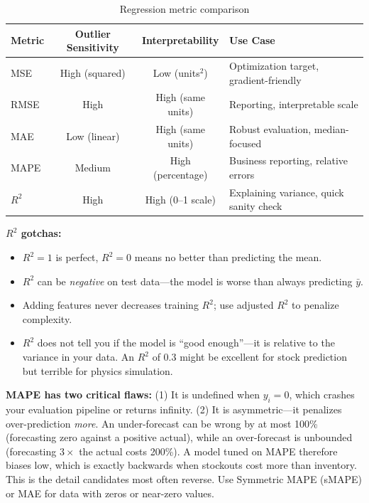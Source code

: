 \begin{table}[H]
\centering
\caption{Regression metric comparison}
\begin{tabularx}{\textwidth}{lccX}
\toprule
\textbf{Metric} & \textbf{Outlier Sensitivity} & \textbf{Interpretability} & \textbf{Use Case} \\
\midrule
MSE & High (squared) & Low (units$^2$) & Optimization target, gradient-friendly \\
RMSE & High & High (same units) & Reporting, interpretable scale \\
MAE & Low (linear) & High (same units) & Robust evaluation, median-focused \\
MAPE & Medium & High (percentage) & Business reporting, relative errors \\
$R^2$ & High & High (0--1 scale) & Explaining variance, quick sanity check \\
\bottomrule
\end{tabularx}
\end{table}

\textbf{$R^2$ gotchas:}
\begin{itemize}
    \item $R^2 = 1$ is perfect, $R^2 = 0$ means no better than predicting the mean.
    \item $R^2$ can be \textit{negative} on test data---the model is worse than always predicting $\bar{y}$.
    \item Adding features never decreases training $R^2$; use adjusted $R^2$ to penalize complexity.
    \item $R^2$ does not tell you if the model is ``good enough''---it is relative to the variance in your data. An $R^2$ of 0.3 might be excellent for stock prediction but terrible for physics simulation.
\end{itemize}

\begin{warningbox}
\textbf{MAPE has two critical flaws:} (1) It is undefined when $y_i = 0$, which crashes your evaluation pipeline or returns infinity. (2) It is asymmetric---it penalizes over-prediction \emph{more}. An under-forecast can be wrong by at most 100\% (forecasting zero against a positive actual), while an over-forecast is unbounded (forecasting $3\times$ the actual costs 200\%). A model tuned on MAPE therefore biases low, which is exactly backwards when stockouts cost more than inventory. This is the detail candidates most often reverse. Use Symmetric MAPE (sMAPE) or MAE for data with zeros or near-zero values.
\end{warningbox}

